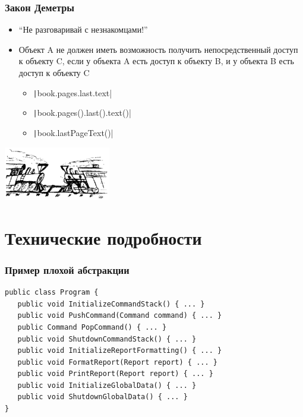 \documentclass{../../slides-style}
\begin{document}
    \begin{frame}
        \frametitle{Закон Деметры}
        \begin{itemize}
            \item ``Не разговаривай с незнакомцами!''
            \item Объект A не должен иметь возможность получить непосредственный доступ к объекту C, если у объекта A есть доступ к объекту B, и у объекта B есть доступ к объекту C
            \begin{itemize}
                \item \texttt|book.pages.last.text|
                \item \texttt|book.pages().last().text()|
                \item \texttt|book.lastPageText()|
            \end{itemize}
        \end{itemize}
        \begin{flushright}
            \includegraphics[width=0.35\textwidth]{trains.png}
        \end{flushright}
    \end{frame}

    \section{Технические подробности}

    \begin{frame}[fragile]
        \frametitle{Пример плохой абстракции}
        \begin{verbatim}
public class Program {
   public void InitializeCommandStack() { ... }
   public void PushCommand(Command command) { ... }
   public Command PopCommand() { ... }
   public void ShutdownCommandStack() { ... }
   public void InitializeReportFormatting() { ... }
   public void FormatReport(Report report) { ... }
   public void PrintReport(Report report) { ... }
   public void InitializeGlobalData() { ... }
   public void ShutdownGlobalData() { ... }
}
        \end{verbatim}
    \end{frame}
\end{document}
